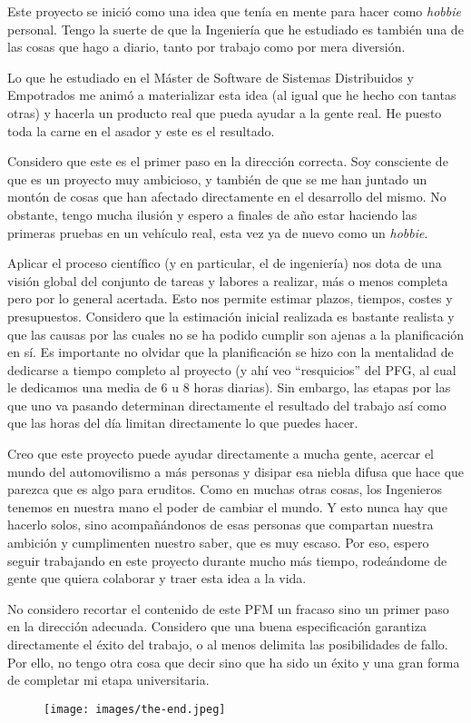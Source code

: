 Este proyecto se inició como una idea que tenía en mente para
hacer como \textit{hobbie} personal. Tengo la suerte de que
la Ingeniería que he estudiado es también una de las cosas que
hago a diario, tanto por trabajo como por mera diversión.

Lo que he estudiado en el Máster de Software de Sistemas Distribuidos y
Empotrados me animó a materializar esta idea (al igual que he hecho con
tantas otras) y hacerla un producto real que pueda ayudar a la gente
real. He puesto toda la carne en el asador y este es el resultado.

Considero que este es el primer paso en la dirección correcta. Soy
consciente de que es un proyecto muy ambicioso, y también de que
se me han juntado un montón de cosas que han afectado directamente
en el desarrollo del mismo. No obstante, tengo mucha ilusión y
espero a finales de año estar haciendo las primeras pruebas en
un vehículo real, esta vez ya de nuevo como un \textit{hobbie}.

Aplicar el proceso científico (y en particular, el de ingeniería)
nos dota de una visión global del conjunto de tareas y labores
a realizar, más o menos completa pero por lo general acertada. Esto
nos permite estimar plazos, tiempos, costes y presupuestos. Considero
que la estimación inicial realizada es bastante realista y que
las causas por las cuales no se ha podido cumplir son ajenas a la
planificación en sí. Es importante no olvidar que la planificación
se hizo con la mentalidad de dedicarse a tiempo completo al proyecto
(y ahí veo ``resquicios'' del PFG, al cual le dedicamos una media de
6 u 8 horas diarias). Sin embargo, las etapas por las que uno va
pasando determinan directamente el resultado del trabajo así como
que las horas del día limitan directamente lo que puedes hacer.

Creo que este proyecto puede ayudar directamente a mucha gente,
acercar el mundo del automovilismo a más personas y disipar esa
niebla difusa que hace que parezca que es algo para eruditos.
Como en muchas otras cosas, los Ingenieros tenemos en nuestra
mano el poder de cambiar el mundo. Y esto nunca hay que hacerlo
solos, sino acompañándonos de esas personas que compartan nuestra
ambición y cumplimenten nuestro saber, que es muy escaso. Por eso,
espero seguir trabajando en este proyecto durante mucho más tiempo,
rodeándome de gente que quiera colaborar y traer esta idea a la
vida.

No considero recortar el contenido de este PFM un fracaso sino
un primer paso en la dirección adecuada. Considero que una buena
especificación garantiza directamente el éxito del trabajo, o al
menos delimita las posibilidades de fallo. Por ello, no tengo otra
cosa que decir sino que ha sido un éxito y una gran forma de completar
mi etapa universitaria.

\begin{figure}[H]
  \centering
  \texttt{[image: images/the-end.jpeg]}
\end{figure}
